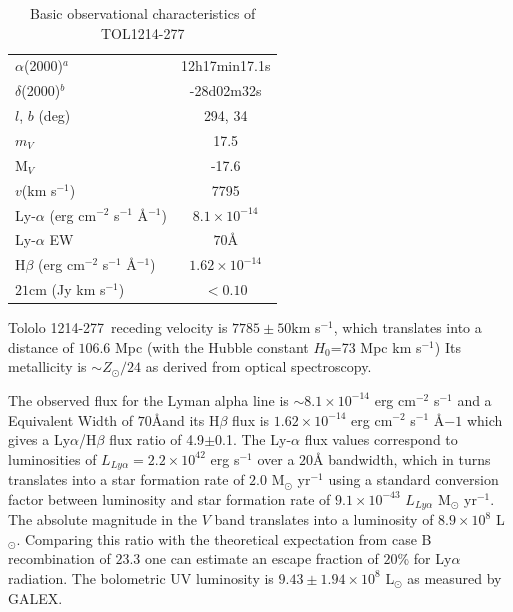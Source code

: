\documentclass[a4paper, usenatbib, 12pt]{article}
\newcommand{\tol}{Tololo 1214-277}
\begin{document}
{\begin{table}
\begin{center}
\begin{tabular}{lc}
$\alpha$(2000)$^{a}$ & 12h17min17.1s\\
$\delta$(2000)$^{b}$ & -28d02m32s\\
$l$, $b$ (deg) & 294, 34\\
$m_V$ & 17.5\\
  M$_V$ & -17.6\\ 
$v$(km s$^{-1}$) & 7795\\
Ly-$\alpha$ (erg cm$^{-2}$ s$^{-1}$ \AA$^{-1}$)& $8.1\times 10^{-14}$ \\
Ly-$\alpha$ EW & $70$\AA\\
H$\beta$ (erg cm$^{-2}$ s$^{-1}$ \AA$^{-1}$) & $1.62\times 10^{-14}$ \\
$21$cm (Jy km s$^{-1}$)& $<0.10$ \\
\end{tabular}
\end{center}
\caption{Basic observational characteristics of TOL1214-277
  \cite{Thuan97}\\} 
\end{table}


\tol\ receding velocity is $7785\pm 50$km s$^{-1}$, which translates
into a distance of $106.6$ Mpc (with the Hubble constant $H_{0}$=73
Mpc km s$^{-1}$) 
Its metallicity is $\sim Z_{\odot}/24$ \cite{Izotov04} as derived from optical
spectroscopy. 


The observed flux for the Lyman alpha line is $\sim
8.1\times 10^{-14}$ erg cm$^{-2}$ s$^{-1}$ \cite{Thuan97}
and a Equivalent Width of $70$\AA and its H$\beta$ flux is 
$1.62\times 10^{-14}$ erg cm$^{-2}$ s$^{-1}$ \AA${-1}$
\cite{Izotov04} which gives a Ly$\alpha$/H$\beta$ flux ratio of
4.9$\pm$0.1. The Ly-$\alpha$ flux values correspond to luminosities of
$L_{Ly\alpha}=2.2\times 10^{42}$ erg s$^{-1}$ over a $20$\AA
bandwidth, which in turns translates  into a star formation rate of
$2.0$ M$_{\odot}$ yr$^{-1}$ using a standard conversion factor between
luminosity and star formation rate of $9.1\times 10^{-43}$
$L_{Ly\alpha}$ M$_{\odot}$ yr$^{-1}$. 
The absolute magnitude in the $V$ band translates into a luminosity of
$8.9\times 10^{8}$ L$_{\odot}$.
Comparing this ratio with the theoretical expectation from case B
recombination of $23.3$ \cite{Hummer1987} one can estimate an escape
fraction of $20$\% for Ly$\alpha$ radiation.
The bolometric UV luminosity is $9.43\pm1.94 \times 10^{8}$
L$_{\odot}$ as measured by GALEX. 


}
\end{document}
